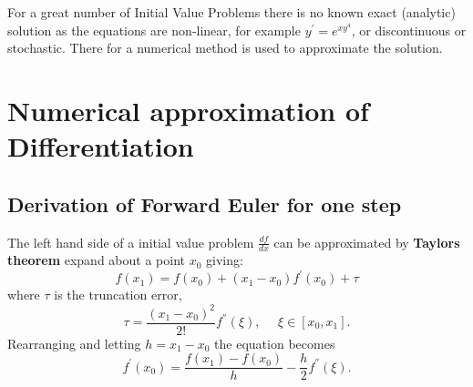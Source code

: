 For a great number of Initial Value Problems there is no known exact (analytic) solution as the equations are non-linear, for example
$y^{'} = e^{xy^4}$, or discontinuous or stochastic. There for a numerical method is used to approximate the solution.  

\section{Numerical approximation of Differentiation}
\subsection{Derivation of Forward Euler for one step}
The left hand side of a initial value problem $\frac{df}{dx}$ can be approximated by  \textbf{Taylors theorem} expand about a point $x_0$ giving:
\begin{equation}f(x_1) = f(x_0)+(x_1-x_0)f^{'}(x_0) + \tau \end{equation}
where $\tau$ is the truncation error,
\begin{equation}\tau = \frac{(x_1-x_0)^2}{2!}f^{''}(\xi), \ \ \ \ \ \ \xi \in [x_0,x_1]. \end{equation}
Rearranging and letting $h=x_1-x_0$ the equation becomes
\[f^{'}(x_0)=\frac{f(x_1)-f(x_0)}{h}-\frac{h}{2}f^{''}(\xi). \]

